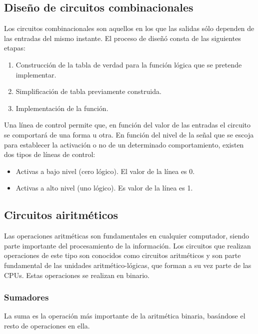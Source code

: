 \documentclass[a4paper, 11pt, titlepage]{article}
\begin{document}
	\subsection{Diseño de circuitos combinacionales}

		Los circuitos combinacionales son aquellos en los que las salidas sólo dependen de las entradas del 
		mismo instante. El proceso de diseñó consta de las siguientes etapas:

		\begin{enumerate}
			\item Construcción de la tabla de verdad para la función lógica que se pretende implementar.
			\item Simplificación de tabla previamente construida.
			\item Implementación de la función.
		\end{enumerate}

		Una línea de control permite que, en función del valor de las entradas el circuito se comportará de 
		una forma u otra. En función del nivel de la señal que se escoja para establecer la activación o no de 
		un determinado comportamiento, existen dos tipos de líneas de control:

		\begin{itemize}
			\item Activas a bajo nivel (cero lógico). El valor de la línea es 0.
			\item Activas a alto nivel (uno lógico). Es valor de la línea es 1.
		\end{itemize}

	\subsection{Circuitos airitméticos}

		Las operaciones aritméticas son fundamentales en cualquier computador, siendo parte importante del procesamiento de 
		la información. Los circuitos que realizan operaciones de este tipo son conocidos como circuitos aritméticos y son 
		parte fundamental de las unidades aritmético-lógicas, que forman a su vez parte de las CPUs. Estas operaciones se 
		realizan en binario.

		\subsubsection{Sumadores}

			La suma es la operación más importante de la aritmética binaria, basándose el resto de operaciones en ella.
\end{document}
